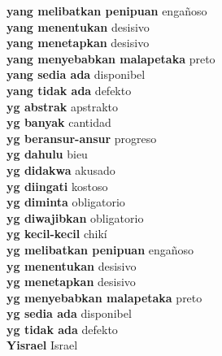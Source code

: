 \textbf{ yang melibatkan penipuan  } engañoso \\
\textbf{ yang menentukan  } desisivo \\
\textbf{ yang menetapkan  } desisivo \\
\textbf{ yang menyebabkan malapetaka  } preto \\
\textbf{ yang sedia ada  } disponibel \\
\textbf{ yang tidak ada  } defekto \\
\textbf{ yg abstrak  } apstrakto \\
\textbf{ yg banyak  } cantidad \\
\textbf{ yg beransur-ansur  } progreso \\
\textbf{ yg dahulu  } bieu \\
\textbf{ yg didakwa  } akusado \\
\textbf{ yg diingati  } kostoso \\
\textbf{ yg diminta  } obligatorio \\
\textbf{ yg diwajibkan  } obligatorio \\
\textbf{ yg kecil-kecil  } chikí \\
\textbf{ yg melibatkan penipuan  } engañoso \\
\textbf{ yg menentukan  } desisivo \\
\textbf{ yg menetapkan  } desisivo \\
\textbf{ yg menyebabkan malapetaka  } preto \\
\textbf{ yg sedia ada  } disponibel \\
\textbf{ yg tidak ada  } defekto \\
\textbf{ Yisrael  } Israel \\
